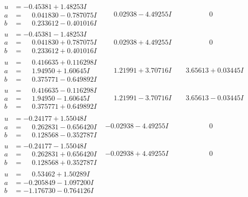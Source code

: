 \documentclass[1p]{elsarticle_modified}
\theoremstyle{definition}
\begin{document}
$$\begin{array}{c|c|c}
\begin{aligned}
u &= -0.45381 + 1.48253 I \\
a &= \phantom{-}0.041830 - 0.787075 I \\
b &= \phantom{-}0.233612 - 0.401016 I\end{aligned}
 & \phantom{-}0.02938 - 4.49255 I & \phantom{-0.000000 } 0 \\ \hline\begin{aligned}
u &= -0.45381 - 1.48253 I \\
a &= \phantom{-}0.041830 + 0.787075 I \\
b &= \phantom{-}0.233612 + 0.401016 I\end{aligned}
 & \phantom{-}0.02938 + 4.49255 I & \phantom{-0.000000 } 0 \\ \hline\begin{aligned}
u &= \phantom{-}0.416635 + 0.116298 I \\
a &= \phantom{-}1.94950 + 1.60645 I \\
b &= \phantom{-}0.375771 - 0.649892 I\end{aligned}
 & \phantom{-}1.21991 + 3.70716 I & \phantom{-}3.65613 + 0.03445 I \\ \hline\begin{aligned}
u &= \phantom{-}0.416635 - 0.116298 I \\
a &= \phantom{-}1.94950 - 1.60645 I \\
b &= \phantom{-}0.375771 + 0.649892 I\end{aligned}
 & \phantom{-}1.21991 - 3.70716 I & \phantom{-}3.65613 - 0.03445 I \\ \hline\begin{aligned}
u &= -0.24177 + 1.55048 I \\
a &= \phantom{-}0.262831 - 0.656420 I \\
b &= \phantom{-}0.128568 - 0.352787 I\end{aligned}
 & -0.02938 - 4.49255 I & \phantom{-0.000000 } 0 \\ \hline\begin{aligned}
u &= -0.24177 - 1.55048 I \\
a &= \phantom{-}0.262831 + 0.656420 I \\
b &= \phantom{-}0.128568 + 0.352787 I\end{aligned}
 & -0.02938 + 4.49255 I & \phantom{-0.000000 } 0 \\ \hline\begin{aligned}
u &= \phantom{-}0.53462 + 1.50289 I \\
a &= -0.205849 - 1.097200 I \\
b &= -1.176730 - 0.764126 I\end{aligned}

\end{array}$$
\end{document}
